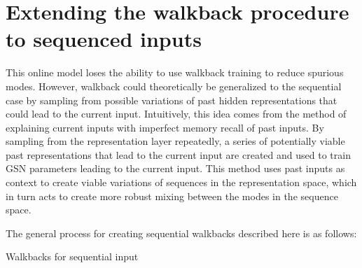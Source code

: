\section{Extending the walkback procedure to sequenced inputs}

This online model loses the ability to use walkback training to reduce spurious modes. However, walkback could theoretically be generalized to the sequential case by sampling from possible variations of past hidden representations that could lead to the current input. Intuitively, this idea comes from the method of explaining current inputs with imperfect memory recall of past inputs. By sampling from the representation layer repeatedly, a series of potentially viable past representations that lead to the current input are created and used to train GSN parameters leading to the current input. This method uses past inputs as context to create viable variations of sequences in the representation space, which in turn acts to create more robust mixing between the modes in the sequence space.

The general process for creating sequential walkbacks described here is as follows:
\begin{algorithm}[h!]
	\caption{ Walkbacks for sequential input }
\end{algorithm}
